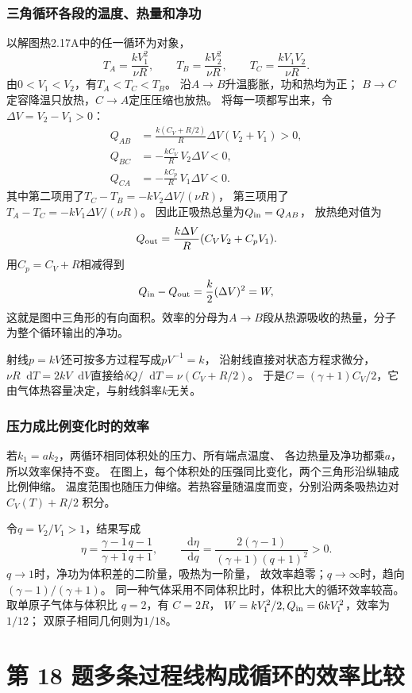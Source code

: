 \documentclass[UTF8,fontset=fandol,a4paper,11pt]{ctexart}
\newcommand{\dd}{\mathop{}\!\mathrm{d}}
\begin{document}
\subsubsection*{三角循环各段的温度、热量和净功}
以解图热2.17A中的任一循环为对象，
\[
T_A=\frac{kV_1^2}{\nu R},\qquad
T_B=\frac{kV_2^2}{\nu R},\qquad
T_C=\frac{kV_1V_2}{\nu R}.
\]
由$0<V_1<V_2$，有$T_A<T_C<T_B$。
沿$A\to B$升温膨胀，功和热均为正；
$B\to C$定容降温只放热，$C\to A$定压压缩也放热。
将每一项都写出来，令$\Delta V=V_2-V_1>0$：
\[
\begin{aligned}
Q_{AB}&=\frac{k(C_V+R/2)}R\Delta V(V_2+V_1)>0,\\
Q_{BC}&=-\frac{kC_V}R\,V_2\Delta V<0,\\
Q_{CA}&=-\frac{kC_p}R\,V_1\Delta V<0.
\end{aligned}
\]
其中第二项用了$T_C-T_B=-kV_2\Delta V/(\nu R)$，
第三项用了$T_A-T_C=-kV_1\Delta V/(\nu R)$。
因此正吸热总量为$Q_{\rm in}=Q_{AB}$，
放热绝对值为
\[
Q_{\rm out}=\frac{k\Delta V}R(C_VV_2+C_pV_1).
\]
用$C_p=C_V+R$相减得到
\[
Q_{\rm in}-Q_{\rm out}=\frac{k}{2}(\Delta V)^2=W,
\]
这就是图中三角形的有向面积。效率的分母为$A\to B$段从热源吸收的热量，分子为整个循环输出的净功。

射线$p=kV$还可按多方过程写成$pV^{-1}=k$，
沿射线直接对状态方程求微分，
$\nu R\dd T=2kV\dd V$直接给$\delta Q/\dd T=\nu(C_V+R/2)$。
于是$C=(\gamma+1)C_V/2$，它由气体热容量决定，与射线斜率$k$无关。

\subsubsection*{压力成比例变化时的效率}
若$k_1=a k_2$，两循环相同体积处的压力、所有端点温度、
各边热量及净功都乘$a$，所以效率保持不变。
在图上，每个体积处的压强同比变化，两个三角形沿纵轴成比例伸缩。
温度范围也随压力伸缩。若热容量随温度而变，分别沿两条吸热边对 $C_V(T)+R/2$ 积分。

令$q=V_2/V_1>1$，结果写成
\[
\eta=\frac{\gamma-1}{\gamma+1}\frac{q-1}{q+1},
\qquad
\frac{\dd\eta}{\dd q}
=\frac{2(\gamma-1)}{(\gamma+1)(q+1)^2}>0.
\]
$q\to1$时，净功为体积差的二阶量，吸热为一阶量，
故效率趋零；$q\to\infty$时，趋向$(\gamma-1)/(\gamma+1)$。
同一种气体采用不同体积比时，体积比大的循环效率较高。
取单原子气体与体积比 $q=2$，有 $C=2R$，
$W=kV_1^2/2,Q_{\rm in}=6kV_1^2$，效率为$1/12$；
双原子相同几何则为$1/18$。




\section*{第 18 题\quad 多条过程线构成循环的效率比较}
\end{document}
